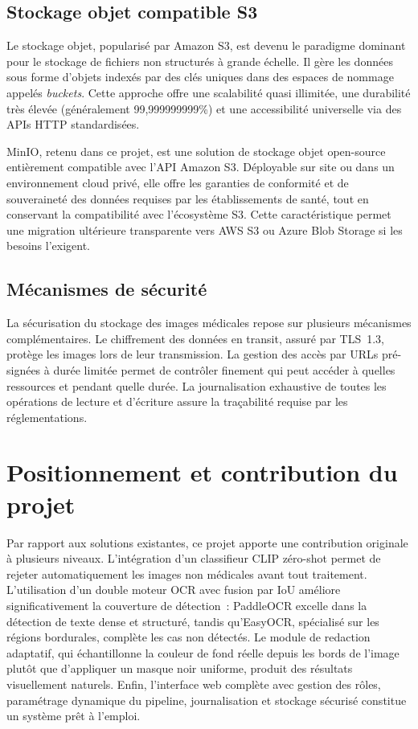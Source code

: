 \subsection{Stockage objet compatible S3}

Le stockage objet, popularisé par Amazon S3, est devenu le paradigme dominant pour le stockage de fichiers non structurés à grande échelle. Il gère les données sous forme d'objets indexés par des clés uniques dans des espaces de nommage appelés \textit{buckets}. Cette approche offre une scalabilité quasi illimitée, une durabilité très élevée (généralement 99,999999999\%) et une accessibilité universelle via des APIs HTTP standardisées.

MinIO, retenu dans ce projet, est une solution de stockage objet open-source entièrement compatible avec l'API Amazon S3. Déployable sur site ou dans un environnement cloud privé, elle offre les garanties de conformité et de souveraineté des données requises par les établissements de santé, tout en conservant la compatibilité avec l'écosystème S3. Cette caractéristique permet une migration ultérieure transparente vers AWS S3 ou Azure Blob Storage si les besoins l'exigent.

\subsection{Mécanismes de sécurité}

La sécurisation du stockage des images médicales repose sur plusieurs mécanismes complémentaires. Le chiffrement des données en transit, assuré par TLS~1.3, protège les images lors de leur transmission. La gestion des accès par URLs pré-signées à durée limitée permet de contrôler finement qui peut accéder à quelles ressources et pendant quelle durée. La journalisation exhaustive de toutes les opérations de lecture et d'écriture assure la traçabilité requise par les réglementations.

\section{Positionnement et contribution du projet}

Par rapport aux solutions existantes, ce projet apporte une contribution originale à plusieurs niveaux. L'intégration d'un classifieur CLIP zéro-shot permet de rejeter automatiquement les images non médicales avant tout traitement. L'utilisation d'un double moteur OCR avec fusion par IoU améliore significativement la couverture de détection~: PaddleOCR excelle dans la détection de texte dense et structuré, tandis qu'EasyOCR, spécialisé sur les régions bordurales, complète les cas non détectés. Le module de redaction adaptatif, qui échantillonne la couleur de fond réelle depuis les bords de l'image plutôt que d'appliquer un masque noir uniforme, produit des résultats visuellement naturels. Enfin, l'interface web complète avec gestion des rôles, paramétrage dynamique du pipeline, journalisation et stockage sécurisé constitue un système prêt à l'emploi.

